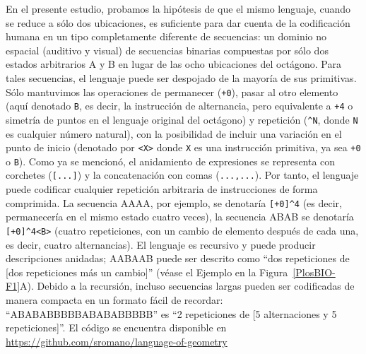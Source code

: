 En el presente estudio, probamos la hipótesis de que el mismo lenguaje, cuando se reduce a sólo dos ubicaciones, es suficiente para dar cuenta de la codificación humana en un tipo completamente diferente de secuencias: un dominio no espacial (auditivo y visual) de secuencias binarias compuestas por sólo dos estados arbitrarios A y B en lugar de las ocho ubicaciones del octágono. Para tales secuencias, el lenguaje puede ser despojado de la mayoría de sus primitivas. Sólo mantuvimos las operaciones de permanecer (\verb#+0#), pasar al otro elemento (aquí denotado \verb#B#, es decir, la instrucción de alternancia, pero equivalente a \verb#+4# o simetría de puntos en el lenguaje original del octágono) y repetición (\verb#^N#, donde \verb#N# es cualquier número natural), con la posibilidad de incluir una variación en el punto de inicio (denotado por \verb#<X># donde \verb#X# es una instrucción primitiva, ya sea \verb#+0# o \verb#B#). Como ya se mencionó, el anidamiento de expresiones se representa con corchetes (\verb#[...]#) y la concatenación con comas (\verb#...,...#). Por tanto, el lenguaje puede codificar cualquier repetición arbitraria de instrucciones de forma comprimida.  La secuencia AAAA, por ejemplo, se denotaría \verb#[+0]^4# (es decir, permanecería en el mismo estado cuatro veces), la secuencia ABAB se denotaría \verb#[+0]^4<B># (cuatro repeticiones, con un cambio de elemento después de cada una, es decir, cuatro alternancias). El lenguaje es recursivo y puede producir descripciones anidadas; AABAAB puede ser descrito como ``dos repeticiones de [dos repeticiones más un cambio]'' (véase el Ejemplo en la Figura~\ref{PlosBIO-F1}A). Debido a la recursión, incluso secuencias largas pueden ser codificadas de manera compacta en un formato fácil de recordar: ``ABABABBBBBABABABBBBB'' es ``2 repeticiones de [5 alternaciones y 5 repeticiones]''. El código se encuentra disponible en \hyperref[https://github.com/sromano/language-of-geometry]{\url{https://github.com/sromano/language-of-geometry}}


